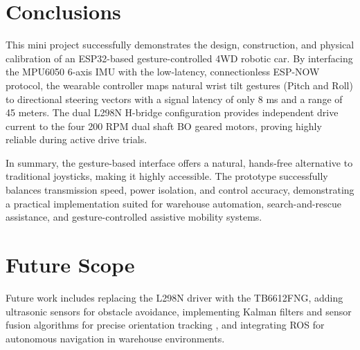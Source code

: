 \documentclass[12pt,a4paper,oneside]{report}
\begin{document}
\section{Conclusions}
This mini project successfully demonstrates the design, construction, and physical calibration of an ESP32-based gesture-controlled 4WD robotic car. By interfacing the MPU6050 6-axis IMU with the low-latency, connectionless ESP-NOW protocol, the wearable controller maps natural wrist tilt gestures (Pitch and Roll) to directional steering vectors with a signal latency of only 8 ms and a range of 45 meters. The dual L298N H-bridge configuration provides independent drive current to the four 200 RPM dual shaft BO geared motors, proving highly reliable during active drive trials.\par
\medskip
In summary, the gesture-based interface offers a natural, hands-free alternative to traditional joysticks, making it highly accessible. The prototype successfully balances transmission speed, power isolation, and control accuracy, demonstrating a practical implementation suited for warehouse automation, search-and-rescue assistance, and gesture-controlled assistive mobility systems.

\section{Future Scope}
Future work includes replacing the L298N driver with the TB6612FNG, adding ultrasonic sensors for obstacle avoidance, implementing Kalman filters and sensor fusion algorithms for precise orientation tracking \cite{fusion_ref}, and integrating ROS for autonomous navigation in warehouse environments.
\end{document}
